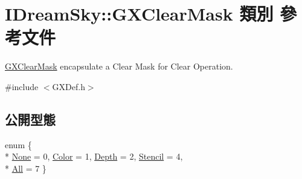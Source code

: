 \hypertarget{class_i_dream_sky_1_1_g_x_clear_mask}{}\section{I\+Dream\+Sky\+:\+:G\+X\+Clear\+Mask 類別 參考文件}
\label{class_i_dream_sky_1_1_g_x_clear_mask}


\hyperlink{class_i_dream_sky_1_1_g_x_clear_mask}{G\+X\+Clear\+Mask} encapsulate a Clear Mask for Clear Operation.  




{\ttfamily \#include $<$G\+X\+Def.\+h$>$}

\subsection*{公開型態}
\begin{DoxyCompactItemize}
\item 
enum \{ \\*
\hyperlink{class_i_dream_sky_1_1_g_x_clear_mask_a3488ea25a2f985b184588e3bc948fbb3abdf6116c4ff7944e79067d75ef9f9644}{None} = 0, 
\hyperlink{class_i_dream_sky_1_1_g_x_clear_mask_a3488ea25a2f985b184588e3bc948fbb3a3bd26720c2d57686ef9d7a6f005198c0}{Color} = 1, 
\hyperlink{class_i_dream_sky_1_1_g_x_clear_mask_a3488ea25a2f985b184588e3bc948fbb3a6c8cb46df668fa13a1a893d3be728a8d}{Depth} = 2, 
\hyperlink{class_i_dream_sky_1_1_g_x_clear_mask_a3488ea25a2f985b184588e3bc948fbb3a3cdf590128f4bf811d11bf66de5d2bec}{Stencil} = 4, 
\\*
\hyperlink{class_i_dream_sky_1_1_g_x_clear_mask_a3488ea25a2f985b184588e3bc948fbb3aa82a38dd1cdbf95a503f7a35565b7739}{All} = 7
 \}
\end{DoxyCompactItemize}
